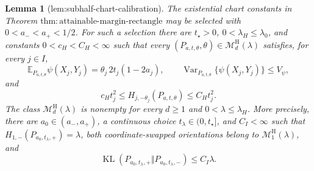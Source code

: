 \documentclass{article}
\newtheorem{lemma}{Lemma}
\begin{document}
\begin{lemma}[lem:subhalf-chart-calibration]\label{lem:subhalf-chart-calibration}
The existential chart constants in Theorem \(\mathrm{thm:attainable\text{-}margin\text{-}rectangle}\) may be selected with \(0<a_-<a_+<1/2\).  For such a selection there are \(t_\star>0\), \(0<\lambda_H\le\lambda_0\), and constants \(0<c_H<C_H<\infty\) such that every \((P_{a,t,\theta},\theta)\in\mathcal M_d^{\mathrm H}(\lambda)\) satisfies, for every \(j\in I\),
\[
\mathbb E_{P_{a,t,\theta}}\psi(X_j,Y_j)=\theta_j\,2t_j(1-2a_j),
\qquad
\operatorname{Var}_{P_{a,t,\theta}}\{\psi(X_j,Y_j)\}\le V_\psi,
\]
and
\[
c_Ht_j^2\le H_{j,-\theta_j}(P_{a,t,\theta})\le C_Ht_j^2.
\]
The class \(\mathcal M_d^{\mathrm H}(\lambda)\) is nonempty for every \(d\ge1\) and \(0<\lambda\le\lambda_H\).  More precisely, there are \(a_0\in(a_-,a_+)\), a continuous choice \(t_\lambda\in(0,t_\star]\), and \(C_I<\infty\) such that \(H_{1,-}(P_{a_0,t_\lambda,+})=\lambda\), both coordinate-swapped orientations belong to \(\mathcal M_1^{\mathrm H}(\lambda)\), and
\[
\operatorname{KL}(P_{a_0,t_\lambda,+}\Vert P_{a_0,t_\lambda,-})\le C_I\lambda.
\]
\end{lemma}
\end{document}
